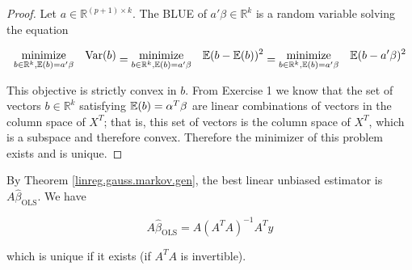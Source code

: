 \begin{proof}

Let \(a \in \mathbb{R}^{(p + 1) \times k}\). The BLUE of \(a' \beta \in \mathbb{R}^k\) is a random variable solving the equation

\[
\begin{aligned}
& \underset{b \in \mathbb{R}^k, \E(b) = a' \beta}{\text{minimize}}
& & \Var( b) \\
\end{aligned} = \begin{aligned}
& \underset{b \in \mathbb{R}^k, \E(b) = a' \beta}{\text{minimize}}
& &\E( b - \E(b))^2 \\
\end{aligned} = \begin{aligned}
& \underset{b \in \mathbb{R}^k, \E(b) = a' \beta}{\text{minimize}}
& &\E( b - a' \beta)^2 \\
\end{aligned}
\]

This objective is strictly convex in \(b\). From Exercise 1 we know that the set of vectors \(b \in \mathbb{R}^k\) satisfying \(\E(b) = \alpha^T \beta\) are linear combinations of vectors in the column space of \(X^T\); that is, this set of vectors is the column space of \(X^T\), which is a subspace and therefore convex. Therefore the minimizer of this problem exists and is unique.

\end{proof}

\begin{remark}

By Theorem \ref{linreg.gauss.markov.gen}, the best linear unbiased estimator is \(A \hat{\beta}_{\text{OLS}}\). We have

\[
A \hat{\beta}_{\text{OLS}} = A (A^TA)^{-1}A^T y
\]

which is unique if it exists (if \(A^TA\) is invertible).

\end{remark}

